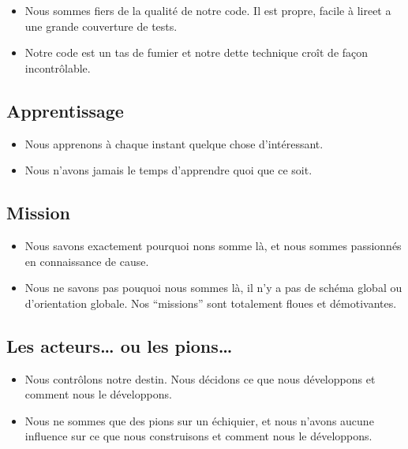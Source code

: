 \begin{itemize}
\item Nous sommes fiers de la qualité de notre code. Il est propre, facile à lireet a une grande couverture de tests.
\item Notre code est un tas de fumier et notre dette technique croît de façon incontrôlable.
\end{itemize}

\subsection{Apprentissage}\hypertarget{apprentissage}{}\label{apprentissage}

\begin{itemize}
\item Nous apprenons à chaque instant quelque chose d'intéressant.
\item Nous n'avons jamais le temps d'apprendre quoi que ce soit.
\end{itemize}

\subsection{Mission}\hypertarget{mission}{}\label{mission}

\begin{itemize}
\item Nous savons exactement pourquoi nons somme là, et nous sommes passionnés en connaissance de cause.
\item Nous ne savons pas pouquoi nous sommes là, il n'y a pas de schéma global ou d'orientation globale. Nos ``missions'' sont totalement floues et démotivantes.
\end{itemize}

\subsection{Les acteurs\ldots{} ou les pions\ldots{}}\hypertarget{les-acteurs-ou-les-pions}{}\label{les-acteurs-ou-les-pions}

\begin{itemize}
\item Nous contrôlons notre destin. Nous décidons ce que nous développons et comment nous le développons.
\item Nous ne sommes que des pions sur un échiquier, et nous n'avons aucune influence sur ce que nous construisons et comment nous le développons.
\end{itemize}

